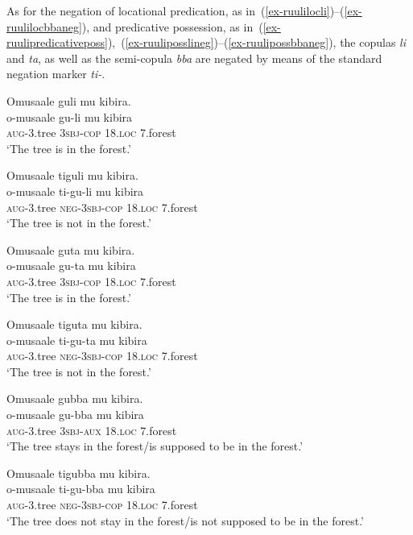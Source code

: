 As for the negation of locational predication, as in~(\ref{ex-ruulilocli})--(\ref{ex-ruulilocbbaneg}), and predicative possession, as in~(\ref{ex-ruulipredicativeposs}),~(\ref{ex-ruuliposslineg})--(\ref{ex-ruulipossbbaneg}), the copulas \textit{li} and \textit{ta}, as well as the semi-copula \textit{bba} are negated by means of the standard negation marker \textit{ti-}. 

\ea \label{ex-ruulinonverbalneg3}
\begin{xlist}
\ex \label{ex-ruulilocli}
	\glll Omusaale guli mu kibira.\\
		  o-musaale gu-li mu kibira\\
		\textsc{aug}-3.tree \textsc{3sbj}-\textsc{cop} 18.\textsc{loc} 7.forest\\
	\glt ‘The tree is in the forest.’ 
	
\ex \label{ex-ruuliloclineg}
	\glll Omusaale tiguli mu kibira.\\
		  o-musaale ti-gu-li mu kibira\\
		\textsc{aug}-3.tree \textsc{neg}-\textsc{3sbj}-\textsc{cop} 18.\textsc{loc} 7.forest\\
	\glt ‘The tree is not in the forest.’ 	
	
\ex \label{ex-ruuliloctaa}
	\glll Omusaale guta mu kibira.\\
		  o-musaale gu-ta mu kibira\\
		\textsc{aug}-3.tree \textsc{3sbj}-\textsc{cop} 18.\textsc{loc} 7.forest\\
	\glt ‘The tree is in the forest.’ 
	
\ex \label{ex-ruuliloctaaneg}
	\glll Omusaale tiguta mu kibira.\\
		  o-musaale ti-gu-ta mu kibira\\
		\textsc{aug}-3.tree \textsc{neg}-\textsc{3sbj}-\textsc{cop} 18.\textsc{loc} 7.forest\\
\glt ‘The tree is not in the forest.’ 
	
	\ex \label{ex-ruulilocbba}
	\glll Omusaale gubba mu kibira.\\
		  o-musaale gu-bba mu kibira\\
		\textsc{aug}-3.tree \textsc{3sbj}-\textsc{aux} 18.\textsc{loc} 7.forest\\
	\glt `The tree stays in the forest/is supposed to be in the forest.’ 

\ex \label{ex-ruulilocbbaneg}
	\glll Omusaale  tigubba mu kibira.\\
	  o-musaale  ti-gu-bba mu kibira\\
		\textsc{aug}-3.tree \textsc{neg}-\textsc{3sbj}-\textsc{cop} 18.\textsc{loc} 7.forest\\
	\glt ‘The tree does not stay in the forest/is not supposed to be in the forest.’ 	


\end{xlist}
